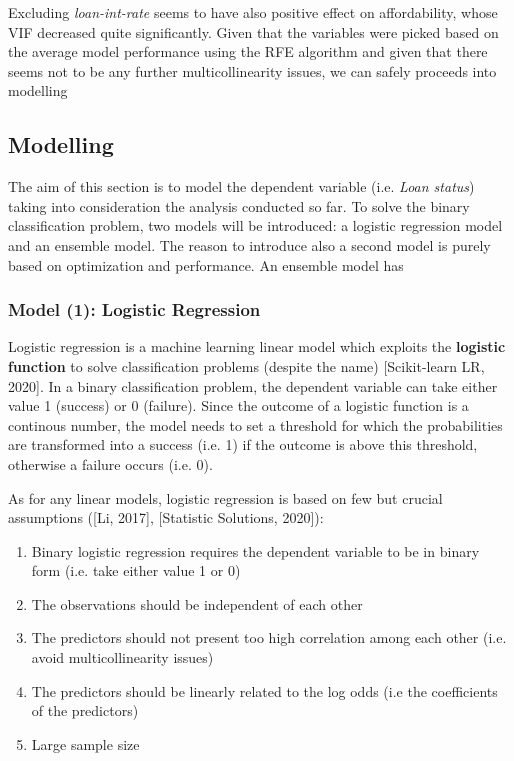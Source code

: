 \documentclass[a4paper,12pt]{article}
\begin{document}
            Excluding \textit{loan-int-rate} seems to have also positive effect on affordability,
            whose VIF decreased quite significantly. Given that the variables were picked based 
            on the average model performance using the RFE algorithm and given that there seems 
            not to be any further multicollinearity issues, we can safely proceeds into modelling


    \subsection{Modelling}

    The aim of this section is to model the dependent variable (i.e. \textit{Loan status}) taking into consideration
    the analysis conducted so far. To solve the binary classification problem, two models will be introduced: a
    logistic regression model and an ensemble model. The reason to introduce also a second model is purely based on 
    optimization and performance. An ensemble model has 

            \subsubsection{Model (1): Logistic Regression}
            Logistic regression is a machine learning linear model which
            exploits the \textbf{logistic function} to solve classification problems (despite the name) [Scikit-learn LR, 2020]. 
            In a binary classification problem, the dependent variable can take 
            either value 1 (success) or 0 (failure). Since the outcome of a logistic function is a continous number, 
            the model needs to set a threshold for which the probabilities are transformed into a 
            success (i.e. 1) if the outcome is above this threshold, otherwise a failure occurs (i.e. 0).

            As for any linear models, logistic regression is based on few 
            but crucial assumptions ([Li, 2017], [Statistic Solutions, 2020]):

                \begin{enumerate}
                    \item Binary logistic regression requires the dependent variable to be in binary form (i.e. take either value 1 or 0)
                    \item The observations should be independent of each other 
                    \item The predictors should not present too high correlation among each other (i.e. avoid multicollinearity issues)
                    \item The predictors should be linearly related to the log odds (i.e the coefficients of the predictors)
                    \item Large sample size 
                \end{enumerate}
\end{document}
